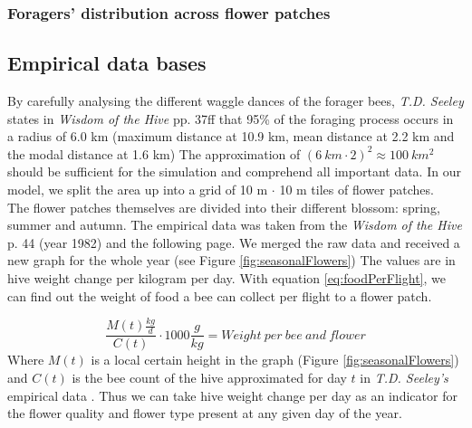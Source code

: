 		\subsubsection{Foragers' distribution across flower patches}
		
		
	\subsection{Empirical data bases}
		By carefully analysing the different waggle dances of the forager bees, \textit{T.D. Seeley} states in \textit{Wisdom of the Hive} pp. 37ff that 95\% of the foraging process occurs in a radius of 6.0 km (maximum distance at 10.9 km, mean distance at 2.2 km and the modal distance at 1.6 km)\cite{seeley95} The approximation of $(6~km \cdot 2)^2 \approx 100~km^2$ should be sufficient for the simulation and comprehend all important data. In our model, we split the area up into a grid of 10 m $\cdot$ 10 m tiles of flower patches. \\
		The flower patches themselves are divided into their different blossom: spring, summer and autumn. The empirical data was taken from the \textit{Wisdom of the Hive} p. 44 (year 1982) and the following page. We merged the raw data and received a new graph for the whole year (see Figure \ref{fig:seasonalFlowers}) The values are in hive weight change per kilogram per day. With equation \ref{eq:foodPerFlight}, we can find out the weight of food a bee can collect per flight to a flower patch.
		
		\begin{equation}\label{eq:foodPerFlight}
					\frac{M(t) \frac{kg}{d}}{C(t)}\cdot 1000 \frac{g}{kg} = Weight~per~bee~and~flower
		\end{equation}
		Where $M(t)$ is a local certain height in the graph (Figure \ref{fig:seasonalFlowers}) and $C(t)$ is the bee count of the hive approximated for day $t$ in \textit{T.D. Seeley's} empirical data \cite{seeley95}. Thus we can take hive weight change per day as an indicator for the flower quality and flower type present at any given day of the year. 
		
